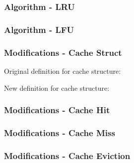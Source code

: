 \documentclass{beamer}
\begin{document}
\begin{frame}
  \frametitle{Algorithm - LRU}

  

\end{frame}

\begin{frame}
  \frametitle{Algorithm - LFU}

  

\end{frame}

\begin{frame}
  \frametitle{Modifications - Cache Struct}

  Original definition for cache structure:
  \begin{adjustbox}{width=\textwidth,keepaspectratio}
    
  \end{adjustbox}

  \vspace{\baselineskip}

  New definition for cache structure:
  \begin{adjustbox}{width=\textwidth,keepaspectratio}
    
  \end{adjustbox}

\end{frame}

\begin{frame}
  \frametitle{Modifications - Cache Hit}

  \begin{adjustbox}{width=\textwidth,keepaspectratio}
    
  \end{adjustbox}

\end{frame}

\begin{frame}
  \frametitle{Modifications - Cache Miss}

  \begin{adjustbox}{width=\textwidth,keepaspectratio}
    
  \end{adjustbox}

\end{frame}

\begin{frame}
  \frametitle{Modifications - Cache Eviction}

  \begin{adjustbox}{width=\textwidth,keepaspectratio}
    
  \end{adjustbox}

\end{frame}
\end{document}
